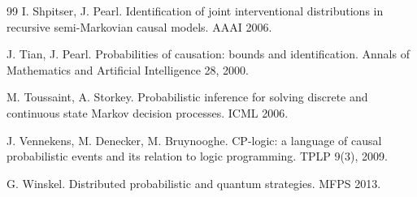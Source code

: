 \documentclass[11pt]{article}
\theoremstyle{plain}
\theoremstyle{definition}
\theoremstyle{remark}
\begin{document}
\begin{thebibliography}{99}
 I. Shpitser, J. Pearl. Identification of joint
interventional distributions in recursive semi-Markovian causal models.
AAAI 2006.

 J. Tian, J. Pearl. Probabilities of causation:
bounds and identification. Annals of Mathematics and Artificial
Intelligence 28, 2000.

 M. Toussaint, A. Storkey. Probabilistic inference
for solving discrete and continuous state Markov decision processes.
ICML 2006.

 J. Vennekens, M. Denecker, M. Bruynooghe.
CP-logic: a language of causal probabilistic events and its relation to
logic programming. TPLP 9(3), 2009.

 G. Winskel. Distributed probabilistic and
quantum strategies. MFPS 2013.

\end{thebibliography}
\end{document}
